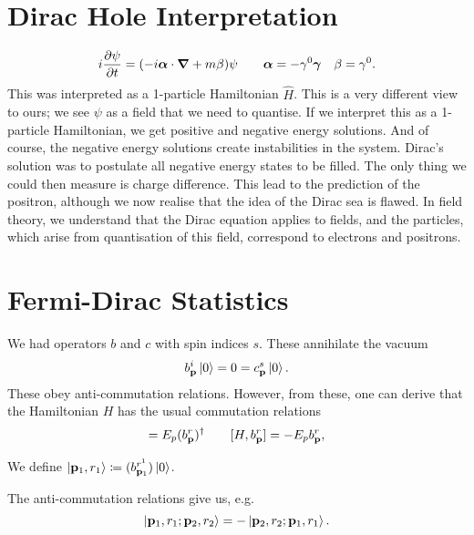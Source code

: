 
\section*{Dirac Hole Interpretation}%
\label{sec:dirac_hole_interpretation}

\begin{equation}
  i \frac{\partial \psi}{\partial t} = (-i \boldsymbol\alpha \cdot \grad + m \beta) \psi \qquad \boldsymbol\alpha = - \gamma^0 \boldsymbol \gamma \quad \beta = \gamma^0.
\end{equation}
This was interpreted as a 1-particle Hamiltonian $\hat{H}$. This is a very different view to ours; we see $\psi$ as a field that we need to quantise.
If we interpret this as a 1-particle Hamiltonian, we get positive and negative energy solutions. And of course, the negative energy solutions create instabilities in the system. Dirac's solution was to postulate all negative energy states to be filled.
The only thing we could then measure is charge difference. This lead to the prediction of the positron, although we now realise that the idea of the Dirac sea is flawed.
In field theory, we understand that the Dirac equation applies to fields, and the particles, which arise from quantisation of this field, correspond to electrons and positrons.

\section{Fermi-Dirac Statistics}%
\label{sec:fermi_dirac_statistics}

We had operators $b$ and $c$ with spin indices $s$. These annihilate the vacuum
\begin{equation}
  b^{i}_{\vb{p}} \ket{0} = 0 = c^{s}_{\vb{p}} \ket{0}.
\end{equation}
These obey anti-commutation relations.
However, from these, one can derive that the Hamiltonian $H$ has the usual commutation relations
\begin{equation}
  [H, (b^{r}_{\vb{p}})^{\dagger}] = E_{p} (b^{r}_{\vb{p}})^{\dagger} \qquad [H, b^{r}_{\vb{p}}] = - E_{p} b^{r}_{\vb{p}},
\end{equation}
 \begin{notation}[]
   We define $\ket{\vb{p}_1, r_1} \coloneqq (b^{r^1}_{\vb{p}_1}) \ket{0}$.
\end{notation}
The anti-commutation relations give us, e.g.
\begin{equation}
  \ket{\vb{p}_1, r_1; \vb{p}_2, r_2} = -\ket{\vb{p}_2, r_2; \vb{p}_1, r_1}.
\end{equation}

